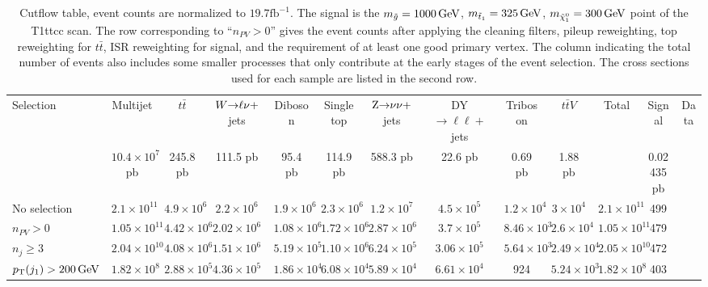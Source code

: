 \begin{sidewaystable}[p]
\centering
\caption{Cutflow table, event counts are normalized to $19.7\textrm{fb}^{-1}$. The signal is the $m_{\tilde{g}}=1000\,\text{Ge\hspace{-.08em}V}$, $m_{\tilde{t}_1}=325\,\text{Ge\hspace{-.08em}V}$, $m_{\tilde{\chi}_1^0}=300\,\text{Ge\hspace{-.08em}V}$ point of the T1ttcc scan. The row corresponding to ``$n_{PV} > 0$'' gives the event counts after applying the cleaning filters, pileup reweighting, top \pt reweighting for $t\bar{t}$, ISR reweighting for signal, and the requirement of at least one good primary vertex. The column indicating the total number of events also includes some smaller processes that only contribute at the early stages of the event selection. 
The cross sections used for each sample are listed in the second row.}
\vspace{1ex}
{\scriptsize
\begin{tabular}{ l || c  c  c  c  c  c  c  c  c | c || c || c }
\hline \hline
Selection & Multijet & $t\bar{t}$ & $W{\rightarrow}\ell\nu+$jets & Diboson & Single top &
$\mathrm{Z}{\rightarrow}\nu\nu+$jets & DY${\rightarrow}\ell\ell+$jets & Triboson & $t\bar{t}V$ & Total &
Signal & Data\\ 
 & $10.4\times 10^7$ pb & 245.8 pb & 111.5 pb & 95.4 pb & 114.9 pb & 588.3 pb & 22.6 pb & 0.69 pb & 1.88 pb & & 0.02435 pb & \\ \hline \hline
No selection & $2.1\times 10^{11}$ & $4.9\times 10^6$ & $2.2\times 10^6$ & $1.9\times 10^6$ & $2.3\times 10^6$ & $1.2\times 10^7$ & $4.5\times 10^5$ & $1.2\times 10^4$ & $3\times 10^4$ & $2.1\times 10^{11}$ & 499 &  \\
$n_{PV} > 0$ & $1.05\times 10^{11}$ & $4.42\times 10^6$ & $2.02\times 10^6$ & $1.08\times 10^6$ & $1.72\times 10^6$ & $2.87\times 10^6$ & $3.7\times 10^5$ & $8.46\times 10^3$ & $2.6\times 10^4$ & $1.05\times 10^{11}$ & 479 & \\
$n_j \geq 3$ & $2.04\times 10^{10}$ & $4.08\times 10^6$ & $1.51\times 10^6$ & $5.19\times 10^5$ & $1.10\times 10^6$ & $6.24\times 10^5$ & $3.06\times 10^5$ & $5.64\times 10^3$ & $2.49\times 10^4$ & $2.05\times 10^{10}$ & 472 &  \\
$p_{\mathrm{T}}(j_1) > 200\,\text{Ge\hspace{-.08em}V}$ & $1.82\times 10^8$ & $2.88\times 10^5$ & $4.36\times 10^5$ & $1.86\times 10^4$ & $6.08\times 10^4$ & $5.89\times 10^4$ & $6.61\times 10^4$ & 924 & $5.24\times 10^3$  & $1.82\times 10^8$ & 403 & \\

\end{tabular}}
\end{sidewaystable}
